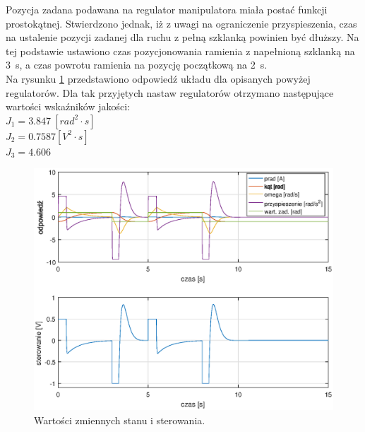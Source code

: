 Pozycja zadana podawana na regulator manipulatora miała postać funkcji prostokątnej. Stwierdzono jednak, iż z uwagi na ograniczenie przyspieszenia, czas na ustalenie pozycji zadanej dla ruchu z pełną szklanką powinien być dłuższy. Na tej podstawie ustawiono czas pozycjonowania ramienia z napełnioną szklanką na 3~s, a czas powrotu ramienia na pozycję początkową na 2~s.\\
Na rysunku \ref{pid_res} przedstawiono odpowied\'z układu dla opisanych powyżej regulatorów.
Dla tak przyjętych nastaw regulatorów otrzymano następujące wartości wska\'zników jakości:\\
\newline
$J_1 = 3.847 \ [rad^2 \cdot s]$\\
$J_2 = 0.7587 [V^2 \cdot s]$\\
$J_3 = 4.606$\\
\begin{figure}[h]
	\centering
	\includegraphics[scale = 0.9]{fig/pid_response.eps}
	\caption		
	{Wartości zmiennych stanu i sterowania.}
	\label{pid_res}
\end{figure} 




	
	
	